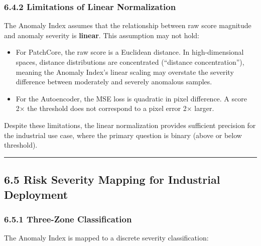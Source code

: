 \subsubsection{6.4.2 Limitations of Linear Normalization}\label{limitations-of-linear-normalization}

The Anomaly Index assumes that the relationship between raw score magnitude and anomaly severity is \textbf{linear}. This assumption may not hold:

\begin{itemize}
\item
  For PatchCore, the raw score is a Euclidean distance. In high-dimensional spaces, distance distributions are concentrated (``distance concentration''), meaning the Anomaly Index's linear scaling may overstate the severity difference between moderately and severely anomalous samples.
\item
  For the Autoencoder, the MSE loss is quadratic in pixel difference. A score 2× the threshold does not correspond to a pixel error 2× larger.
\end{itemize}

Despite these limitations, the linear normalization provides sufficient precision for the industrial use case, where the primary question is binary (above or below threshold).

\begin{center}\rule{0.5\linewidth}{0.5pt}\end{center}

\subsection{6.5 Risk Severity Mapping for Industrial Deployment}\label{risk-severity-mapping-for-industrial-deployment}

\subsubsection{6.5.1 Three-Zone Classification}\label{three-zone-classification}

The Anomaly Index is mapped to a discrete severity classification:

